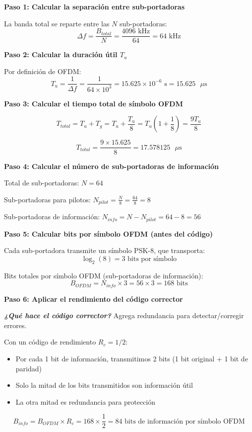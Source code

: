 \documentclass[11pt,a4paper]{article}
\begin{document}
\textbf{Paso 1: Calcular la separaci\'on entre sub-portadoras}

La banda total se reparte entre las $N$ sub-portadoras:
\[
\Delta f = \frac{B_{total}}{N} = \frac{4096 \text{ kHz}}{64} = 64 \text{ kHz}
\]

\textbf{Paso 2: Calcular la duraci\'on \'util $T_u$}

Por definici\'on de OFDM:
\[
T_u = \frac{1}{\Delta f} = \frac{1}{64 \times 10^3} = 15.625 \times 10^{-6} \text{ s} = 15.625 \text{ }\mu\text{s}
\]

\textbf{Paso 3: Calcular el tiempo total de s\'imbolo OFDM}

\[
T_{total} = T_u + T_g = T_u + \frac{T_u}{8} = T_u \left(1 + \frac{1}{8}\right) = \frac{9T_u}{8}
\]

\[
T_{total} = \frac{9 \times 15.625}{8} = 17.578125 \text{ }\mu\text{s}
\]

\textbf{Paso 4: Calcular el n\'umero de sub-portadoras de informaci\'on}

Total de sub-portadoras: $N = 64$

Sub-portadoras para pilotos: $N_{pilot} = \frac{N}{8} = \frac{64}{8} = 8$

Sub-portadoras de informaci\'on: $N_{info} = N - N_{pilot} = 64 - 8 = 56$

\textbf{Paso 5: Calcular bits por s\'imbolo OFDM (antes del c\'odigo)}

Cada sub-portadora transmite un s\'imbolo PSK-8, que transporta:
\[
\log_2(8) = 3 \text{ bits por s\'imbolo}
\]

Bits totales por s\'imbolo OFDM (sub-portadoras de informaci\'on):
\[
B_{OFDM} = N_{info} \times 3 = 56 \times 3 = 168 \text{ bits}
\]

\textbf{Paso 6: Aplicar el rendimiento del c\'odigo corrector}

\textit{\textbf{¿Qu\'e hace el c\'odigo corrector?}} Agrega redundancia para detectar/corregir errores.

Con un c\'odigo de rendimiento $R_c = 1/2$:
\begin{itemize}
    \item Por cada 1 bit de informaci\'on, transmitimos 2 bits (1 bit original + 1 bit de paridad)
    \item Solo la mitad de los bits transmitidos son informaci\'on \'util
    \item La otra mitad es redundancia para protecci\'on
\end{itemize}

\[
B_{info} = B_{OFDM} \times R_c = 168 \times \frac{1}{2} = 84 \text{ bits de informaci\'on por s\'imbolo OFDM}
\]
\end{document}
